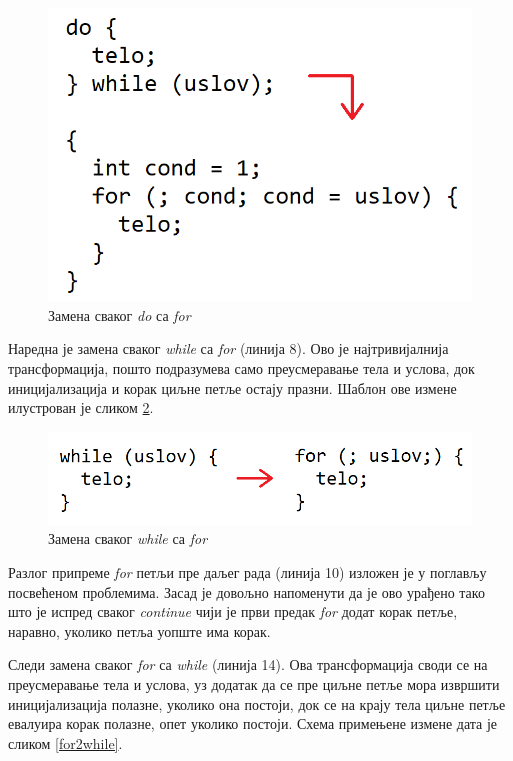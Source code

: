 \documentclass[a4paper]{article}
\begin{document}
\begin{figure}[h!]
\begin{center}
\includegraphics[scale=0.6]{do2for}
\end{center}
\caption{Замена сваког \textit{do} са \textit{for}}
\label{do2for}
\end{figure}

Наредна је замена сваког \textit{while} са \textit{for} (линија 8). Ово је најтривијалнија трансформација, пошто подразумева само преусмеравање тела и услова, док иницијализација и корак циљне петље остају празни. Шаблон ове измене илустрован је сликом \ref{while2for}.

\begin{figure}[h!]
\begin{center}
\includegraphics[scale=0.6]{while2for}
\end{center}
\caption{Замена сваког \textit{while} са \textit{for}}
\label{while2for}
\end{figure}

Разлог припреме \textit{for} петљи пре даљег рада (линија 10) изложен је у поглављу посвећеном проблемима. Засад је довољно напоменути да је ово урађено тако што је испред сваког \textit{continue} чији је први предак \textit{for} додат корак петље, наравно, уколико петља уопште има корак.

Следи замена сваког \textit{for} са \textit{while} (линија 14). Ова трансформација своди се на преусмеравање тела и услова, уз додатак да се пре циљне петље мора извршити иницијализација полазне, уколико она постоји, док се на крају тела циљне петље евалуира корак полазне, опет уколико постоји. Схема примењене измене дата је сликом \ref{for2while}.
\end{document}
